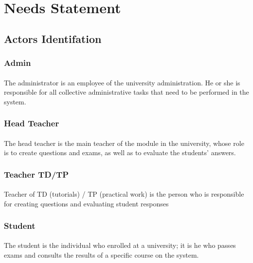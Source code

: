 \documentclass[]{uc2pfecaneva}
\begin{document}
    \raggedright\section{Needs Statement}
    \raggedright\subsection{Actors Identifation}
    \raggedright\subsubsection{Admin}
    \justifying\paragraph{}
    The administrator is an employee of the university administration. He or she is responsible for all collective administrative tasks that need to be performed in the system.

    \raggedright\subsubsection{Head Teacher}
    \justifying\paragraph{}
    The head teacher is the main teacher of the module in the university, whose role is to create questions and exams, as well as to evaluate the students' answers.

    \raggedright\subsubsection{Teacher TD/TP}
    \justifying\paragraph{}
    Teacher of TD (tutorials) / TP (practical work) is the person who is responsible for creating questions and evaluating student responses


    \raggedright\subsubsection{Student}
    \justifying\paragraph{}
    The student is the individual who enrolled at a university; it is he who passes exams and consults the results of a specific course on the system.
\end{document}
